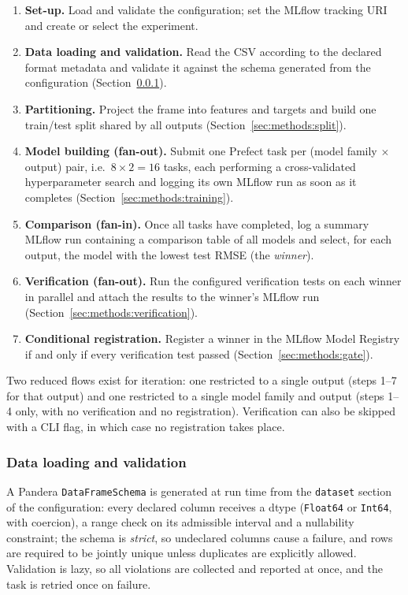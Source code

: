 \begin{enumerate}
  \item \textbf{Set-up.} Load and validate the configuration; set the MLflow
    tracking URI and create or select the experiment.
  \item \textbf{Data loading and validation.} Read the CSV according to the
    declared format metadata and validate it against the schema generated
    from the configuration (Section~\ref{sec:methods:data}).
  \item \textbf{Partitioning.} Project the frame into features and targets and
    build one train/test split shared by all outputs
    (Section~\ref{sec:methods:split}).
  \item \textbf{Model building (fan-out).} Submit one Prefect task per
    (model family $\times$ output) pair, i.e.\ $8 \times 2 = 16$ tasks, each
    performing a cross-validated hyperparameter search and logging its own
    MLflow run as soon as it completes (Section~\ref{sec:methods:training}).
  \item \textbf{Comparison (fan-in).} Once all tasks have completed, log a
    summary MLflow run containing a comparison table of all models and
    select, for each output, the model with the lowest test RMSE
    (the \emph{winner}).
  \item \textbf{Verification (fan-out).} Run the configured verification
    tests on each winner in parallel and attach the results to the winner's
    MLflow run (Section~\ref{sec:methods:verification}).
  \item \textbf{Conditional registration.} Register a winner in the MLflow
    Model Registry if and only if every verification test passed
    (Section~\ref{sec:methods:gate}).
\end{enumerate}

Two reduced flows exist for iteration: one restricted to a single output
(steps 1--7 for that output) and one restricted to a single model family and
output (steps 1--4 only, with no verification and no registration).
Verification can also be skipped with a CLI flag, in which case no
registration takes place.

\subsubsection{Data loading and validation}
\label{sec:methods:data}

A Pandera \texttt{DataFrameSchema} is generated at run time from the
\texttt{dataset} section of the configuration: every declared column receives
a dtype (\texttt{Float64} or \texttt{Int64}, with coercion), a range check on
its admissible interval and a nullability constraint; the schema is
\emph{strict}, so undeclared columns cause a failure, and rows are required
to be jointly unique unless duplicates are explicitly allowed. Validation is
lazy, so all violations are collected and reported at once, and the task is
retried once on failure.

